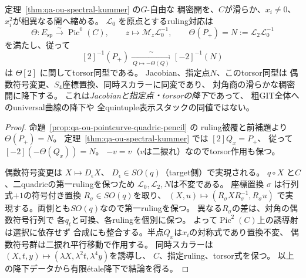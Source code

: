 \begin{theorem}[滑らかな対角開でのOU四重射とPicard根の同一視]
\label{thm:qa-ou-diagonal-picard-torsor}
定理~\ref{thm:qa-ou-spectral-kummer} の$G$-自由な
稠密開を、$C$が滑らか、$x_i\ne0$、
$x_i^2$が相異なる開へ縮める。
$\mathcal L_0$ を原点とするruling対応は
\[
 \Theta:E_{\mathrm{sp}}\xrightarrow{\sim}\operatorname{Pic}^0(C),
 \qquad z\longmapsto\mathcal M_z\mathcal L_0^{-1},
 \qquad \Theta(P_+)=N:=\mathcal L_2\mathcal L_0^{-1}
\]
を満たし、従って
\[
 [2]^{-1}(P_+)\xrightarrow[\ Q\mapsto-\Theta(Q)\ ]{\sim}
 [-2]^{-1}(N)
 \tag{OU-Pic}\label{eq:qa-ou-generic-picard-identification}
\]
は $\Theta[2]$ に関してtorsor同型である。
Jacobian、指定点$N$、このtorsor同型は
偶数符号変更、$S_4$座標置換、同時スカラーに同変であり、
対角商の滑らかな稠密開に降下する。
これは\emph{Jacobianと指定点・torsorの降下}であって、
粗GIT全体へのuniversal曲線の降下や
全quintuple表示スタックの同値ではない。
\end{theorem}
\begin{proof}
命題~\ref{prop:qa-ou-pointcurve-quadric-pencil} の
ruling被覆と前補題より $\Theta(P_+)=N$。
定理~\ref{thm:qa-ou-spectral-kummer} では $[2]Q_x=P_+$、
従って $[-2](-\Theta(Q_x))=N$。
$-v=v$（$v$は二捩れ）なのでtorsor作用も保つ。

偶数符号変更は $X\mapsto D_\epsilon X$、
$D_\epsilon\in SO(q)$（target側）で実現される。
$q\circ X$ と$C$、二quadricの第一rulingを保つため
$\mathcal L_0,\mathcal L_2,N$は不変である。
座標置換 $\sigma$ は行列式$+1$の符号付き置換
$R_\sigma\in SO(q)$を取り、
$(X,u)\mapsto(R_\sigma XR_\sigma^{-1},R_\sigma u)$
で実現する。両側とも$SO(q)$なので第一rulingを保つ。
異なる$R_\sigma$の差は、対角の偶数符号行列で
各$q_t$と可換、各rulingを個別に保つ。
よって$\operatorname{Pic}^2(C)$上の誘導射は選択に依存せず
合成にも整合する。半点$Q_x$は$x_i$の対称式であり置換不変、
偶数符号群は二捩れ平行移動で作用する。
同時スカラーは$(X,t,y)\mapsto
(\lambda X,\lambda^2t,\lambda^4y)$を誘導し、
$C$、指定ruling、torsor式を保つ。
以上の降下データから有限étale降下で結論を得る。
\end{proof}

